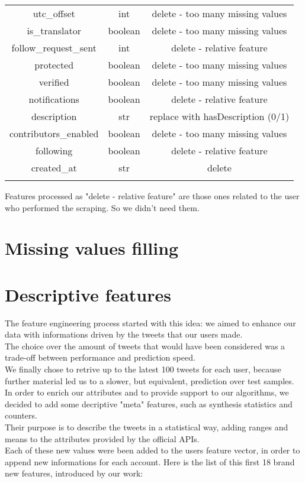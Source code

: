 \begin{center}
\begin{tabular}{ccc}
		utc\_offset&int&delete - too many missing values\\
		is\_translator&boolean&delete - too many missing values\\
		follow\_request\_sent&int&delete - relative feature\\
		protected&boolean&delete - too many missing values\\
		verified&boolean&delete - too many missing values\\
		notifications&boolean&delete - relative feature\\
		description&str&replace with hasDescription (0/1)\\
		contributors\_enabled&boolean&delete - too many missing values\\
		following&boolean&delete - relative feature\\
		created\_at&str&delete\\\hline\\
	\end{tabular}
\end{center}
\normalsize

Features processed as "delete - relative feature" are those ones related to the user who performed the scraping. So we didn't need them.

\section{Missing values filling}
\section{Descriptive features}
The feature engineering process started with this idea: we aimed to enhance our data with informations driven by the tweets that our users made.\\
The choice over the amount of tweets that would have been considered was a trade-off between performance and prediction speed.\\
We finally chose to retrive up to the latest 100 tweets for each user, because further material led us to a slower, but equivalent, prediction over test samples.
In order to enrich our attributes and to provide support to our algorithms, we decided to add some decriptive "meta" features, such as synthesis statistics and counters.\\
Their purpose is to describe the tweets in a statistical way, adding ranges and means to the attributes provided by the official APIs.\\
Each of these new values were been added to the users feature vector, in order to append new informations for each account.
Here is the list of this first 18 brand new features, introduced by our work:

